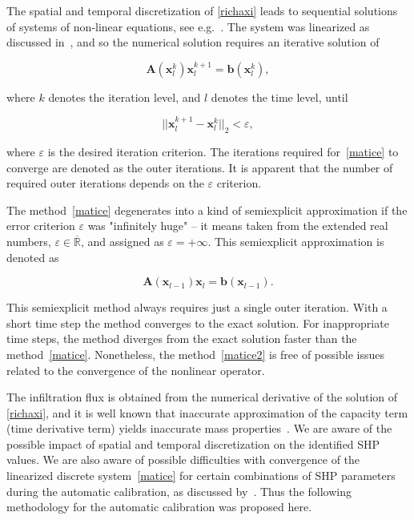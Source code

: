 \documentclass[review]{elsarticle}
\newenvironment{lineq}
    {\begin{linenomath*}
    \begin{equation}
    }
    { 
    \end{equation} 
    \end{linenomath*}
    }
\renewcommand{\vec}{\mathbf}
\begin{document}
 
 The spatial and temporal discretization of \eqref{richaxi} leads to sequential solutions of systems of non-linear equations, see e.g.~\citep{mojecomp}. The system was linearized as discussed in~\citet{mojeacta, mojeamc}, and so the numerical solution requires an iterative solution of 
\begin{lineq}
\label{matice}
\mathbf{A}(\vec{x}_l^k) \vec{x}_l^{k+1} = \vec{b}(\vec{x}_l^k),
\end{lineq}
where $k$ denotes the iteration level, and $l$ denotes the time level, until \begin{lineq} \label{picard} ||\vec{x}_l^{k+1} - \vec{x}_l^k||_2 < \varepsilon , \end{lineq} where $\varepsilon$ is the desired iteration criterion. The iterations required for~\eqref{matice} to converge are denoted as the outer iterations. It is apparent that the number of required outer iterations depends on the $\varepsilon$ criterion. 


The method~\eqref{matice} degenerates into a kind of semiexplicit approximation if the error criterion $\varepsilon$ was "infinitely huge" -- it means taken from the extended real numbers, $\varepsilon \in {\overline {\mathbb {R} }}$, and assigned as $\varepsilon = + \infty$. This semiexplicit approximation is denoted as
\begin{lineq}
\label{matice2}
\mathbf{A}(\vec{x}_{l-1}) \vec{x}_l = \vec{b}(\vec{x}_{l-1}).
\end{lineq}
 This semiexplicit method always requires just a single outer iteration. With a short time step the method converges to the exact solution. For inappropriate time steps, the method diverges from the exact solution faster than the method~\eqref{matice}. Nonetheless, the method~\eqref{matice2} is free of possible issues related to the convergence of the nonlinear operator.

The infiltration flux is obtained from the numerical derivative of the solution of \eqref{richaxi},  and  it is well known that inaccurate approximation of the capacity term (time derivative term) yields inaccurate mass properties~\citep{celia}. We are aware of the possible impact of spatial and temporal discretization on the identified SHP values. We are also aware of possible difficulties with convergence of the linearized discrete system~\eqref{matice} for certain combinations of SHP parameters during the automatic calibration, as discussed by~\cite{beven2003-uncertain}.
Thus the following methodology for the automatic calibration was proposed here.
\end{document}
